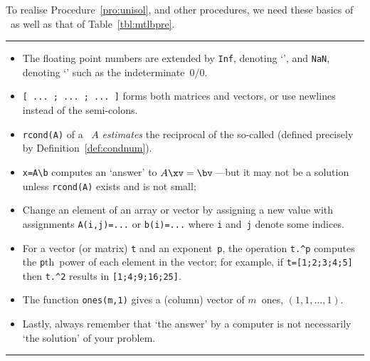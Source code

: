\begin{table}
\caption{To realise Procedure~\ref{pro:unisol}, and other procedures, we need these basics of \script\ as well as that of Table~\ref{tbl:mtlbpre}.} \label{tbl:mtlbbasics}
\hrule
\begin{minipage}{\linewidth}
\begin{itemize}
\item The floating point numbers are extended by \verb|Inf|, denoting `', and \verb|NaN|, denoting `' such as the indeterminate~\(0/0\).
\item {}\verb|[ ... ; ... ; ... ]| forms both matrices and vectors, or use newlines instead of the semi-colons.
\item {}\verb|rcond(A)|  of a ~\(A\) \emph{estimates} the reciprocal of the so-called  (defined precisely by Definition~\ref{def:condnum}).
\item {}\verb|x=A\b| computes an `answer' to \(A\xv=\bv\)\,---but it may not be a solution unless \verb|rcond(A)| exists and is not small;
\item {}Change an element of an array or vector by assigning a new value with assignments \verb|A(i,j)=...| or \verb|b(i)=...| where \verb|i| and~\verb|j| denote some indices.
\item {}For a vector (or matrix) \verb|t| and an exponent~\verb|p|, the operation \verb|t.^p| computes the \verb|p|th~power of each element in the vector; for example, if \verb|t=[1;2;3;4;5]| then \verb|t.^2| results in \verb|[1;4;9;16;25]|.
\item The function \verb|ones(m,1)| gives a (column) vector of \(m\)~ones, \((1,1,\ldots,1)\).
\item Lastly, always remember that `the answer' by a computer is not necessarily `the solution' of your problem.
\end{itemize}
\end{minipage}
\hrule
\end{table}


